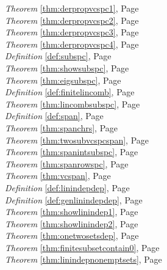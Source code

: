\begin{multicols}{3}
\begin{center}
      \textit{Theorem} \ref{thm:derpropvcspc1}, Page \pageref{thm:derpropvcspc1} \\
      \textit{Theorem} \ref{thm:derpropvcspc2}, Page \pageref{thm:derpropvcspc2} \\
      \textit{Theorem} \ref{thm:derpropvcspc3}, Page \pageref{thm:derpropvcspc3} \\
      \textit{Theorem} \ref{thm:derpropvcspc4}, Page \pageref{thm:derpropvcspc4} \\
      \textit{Definition} \ref{def:subspc}, Page \pageref{def:subspc} \\
      \textit{Theorem} \ref{thm:showsubspc}, Page \pageref{thm:showsubspc} \\
      \textit{Theorem} \ref{thm:eigsubspc}, Page \pageref{thm:eigsubspc} \\
      \textit{Definition} \ref{def:finitelincomb}, Page \pageref{def:finitelincomb} \\
      \textit{Theorem} \ref{thm:lincombsubspc}, Page \pageref{thm:lincombsubspc} \\
      \textit{Definition} \ref{def:span}, Page \pageref{def:span} \\
      \textit{Theorem} \ref{thm:spanchrs}, Page \pageref{thm:spanchrs} \\
      \textit{Theorem} \ref{thm:twosubvcspcspan}, Page \pageref{thm:twosubvcspcspan} \\
      \textit{Theorem} \ref{thm:spanintsubspc}, Page \pageref{thm:spanintsubspc} \\
      \textit{Theorem} \ref{thm:spanrowspc}, Page \pageref{thm:spanrowspc} \\
      \textit{Theorem} \ref{thm:vcspan}, Page \pageref{thm:vcspan} \\
      \textit{Definition} \ref{def:linindepdep}, Page \pageref{def:linindepdep} \\
      \textit{Definition} \ref{def:genlinindepdep}, Page \pageref{def:genlinindepdep} \\
      \textit{Theorem} \ref{thm:showlinindep1}, Page \pageref{thm:showlinindep1} \\
      \textit{Theorem} \ref{thm:showlinindep2}, Page \pageref{thm:showlinindep2} \\
      \textit{Theorem} \ref{thm:onetwosetsdep}, Page \pageref{thm:onetwosetsdep} \\
      \textit{Theorem} \ref{thm:finitesubsetcontain0}, Page \pageref{thm:finitesubsetcontain0} \\
      \textit{Theorem} \ref{thm:linindepnonemptsets}, Page \pageref{thm:linindepnonemptsets} \\

\end{center}
\end{multicols}

